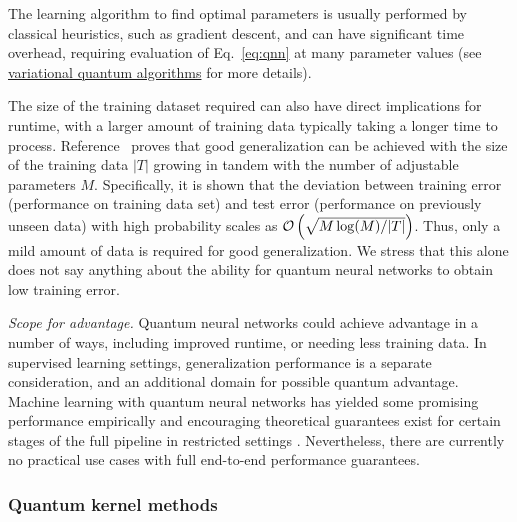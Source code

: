 \begin{refsection}
The learning algorithm to find optimal parameters is usually performed by classical heuristics, such as gradient descent, and can have significant time overhead, requiring evaluation of Eq.~\eqref{eq:qnn} at many parameter values (see \hyperref[prim:VQA]{variational quantum algorithms} for more details).

The size of the training dataset required can also have direct implications for runtime, with a larger amount of training data typically taking a longer time to process. 
Reference~\cite{caro2022generalization} proves that good generalization can be achieved with the size of the training data $|T|$ growing in tandem with the number of adjustable parameters $M$. Specifically, it is shown that the deviation between training error (performance on training data set) and test error (performance on previously unseen data) with high probability scales as $\mathcal{O}\left( \sqrt{M\log(M) / |T|} \right)$. Thus, only a mild amount of data is required for good generalization. We stress that this alone does not say anything about the ability for quantum neural networks to obtain low training error.


\textit{Scope for advantage.} Quantum neural networks could achieve advantage in a number of ways, including improved runtime, or needing less training data. In supervised learning settings, generalization performance is a separate consideration, and an additional domain for possible quantum advantage. Machine learning with quantum neural networks has yielded some promising performance empirically and encouraging theoretical guarantees exist for certain stages of the full pipeline in restricted settings \cite{schatzki2022GuaranteesEquivariantQNNs, caro2021encoding, caro2022generalization, liu2023AnalyticTheoryQNN, you2023analyzing}. Nevertheless, there are currently no practical use cases with full end-to-end performance guarantees.




\subsubsection*{Quantum kernel methods}


\end{refsection}
